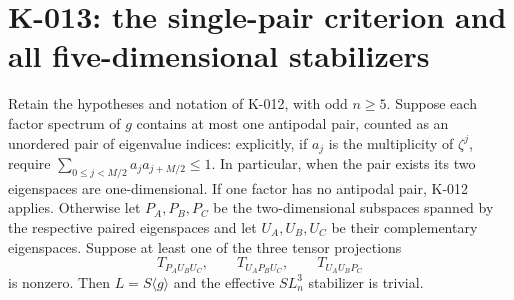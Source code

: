 \section{K-013: the single-pair criterion and all five-dimensional stabilizers}

\begin{theorem}[K-013]
Retain the hypotheses and notation of K-012, with odd $n\ge5$.
Suppose each factor spectrum of $g$ contains at most one antipodal
pair, counted as an unordered pair of eigenvalue indices: explicitly,
if $a_j$ is the multiplicity of $\zeta^j$, require
$\sum_{0\le j<M/2}a_j a_{j+M/2}\le1$.
In particular, when the pair exists its two eigenspaces are
one-dimensional.  If one factor has no antipodal pair,
K-012 applies.  Otherwise let $P_A,P_B,P_C$ be the two-dimensional
subspaces spanned by the respective paired eigenspaces and let
$U_A,U_B,U_C$ be their complementary eigenspaces.  Suppose at least one
of the three tensor projections
\[
 T_{P_AU_BU_C},\qquad T_{U_AP_BU_C},\qquad T_{U_AU_BP_C}
\]
is nonzero.  Then $L=S\langle g\rangle$ and the effective
$SL_n^3$ stabilizer is trivial.
\end{theorem}


